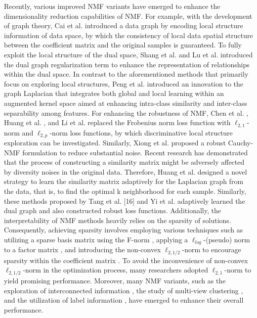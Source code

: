 \documentclass[a4paper,fleqn]{cas-sc}
\begin{document}
Recently, various improved NMF variants have emerged to enhance the dimensionality reduction capabilities of NMF. For example, with the development of graph theory, Cai et al. \cite{19} introduced a data graph by encoding local structure information of data space, by which the consistency of local data spatial structure between the coefficient matrix and the original samples is guaranteed. To fully exploit the local structure of the dual space, Shang et al. \cite{29} and Lu et al. \cite{30} introduced the dual graph regularization term to enhance the representation of relationships within the dual space. In contrast to the aforementioned methods that primarily focus on exploring local structures, Peng et al. \cite{51}introduced an innovation to the graph Laplacian that integrates both global and local learning within an augmented kernel space aimed at enhancing intra-class similarity and inter-class separability among features.
 For enhancing the robustness of NMF, Chen et al. \cite{31}, Huang et al. \cite{32}, and Li et al. \cite{33} replaced the Frobenius norm loss function with $\ell_{2,1}$-norm and $\ell_{2,p}$-norm loss functions, by which discriminative local structure exploration can be investigated. Similarly, Xiong et al. \cite{34} proposed a robust Cauchy-NMF formulation to reduce substantial noise. Recent research has demonstrated that the process of constructing a similarity matrix might be adversely affected by diversity noises in the original data. Therefore, Huang et al. \cite{35} designed a novel strategy to learn the similarity matrix adaptively for the Laplacian graph from the data, that is, to find the optimal k neighborhood for each sample. Similarly, these methods proposed by Tang et al. [16] and Yi et al. \cite{36} adaptively learned the dual graph and also constructed robust loss functions. Additionally, the interpretability of NMF methods heavily relies on the sparsity of solutions. Consequently, achieving sparsity involves employing various techniques such as utilizing a sparse basis matrix using the F-norm \cite{37}, applying a  $\ell_{log}$-(pseudo) norm to a factor matrix \cite{38}, and introducing the non-convex $\ell_{2,1/2}$-norm to encourage sparsity within the coefficient matrix \cite{23}. To avoid the inconvenience of non-convex $\ell_{2,1/2}$-norm in the optimization process, many researchers \cite{22,39,40} adopted $\ell_{2,1}$-norm to yield promising performance. Moreover, many NMF variants, such as the exploration of interconnected information \cite{41,42}, the study of multi-view clustering \cite{43,44}, and the utilization of label information \cite{9,10,11}, have emerged to enhance their overall performance. 
\end{document}
